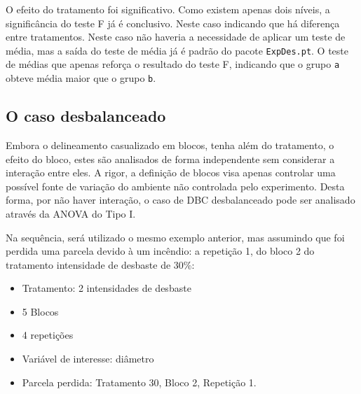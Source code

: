 \documentclass[
]{article}
\providecommand{\tightlist}{%
  \setlength{\itemsep}{0pt}\setlength{\parskip}{0pt}}
\begin{document}
O efeito do tratamento foi significativo. Como existem apenas dois níveis, a significância do teste F já é conclusivo. Neste caso indicando que há diferença entre tratamentos. Neste caso não haveria a necessidade de aplicar um teste de média, mas a saída do teste de média já é padrão do pacote \texttt{ExpDes.pt}. O teste de médias que apenas reforça o resultado do teste F, indicando que o grupo \texttt{a} obteve média maior que o grupo \texttt{b}.

\hypertarget{o-caso-desbalanceado-1}{%
\subsection{O caso desbalanceado}\label{o-caso-desbalanceado-1}}

Embora o delineamento casualizado em blocos, tenha além do tratamento, o efeito do bloco, estes são analisados de forma independente sem considerar a interação entre eles. A rigor, a definição de blocos visa apenas controlar uma possível fonte de variação do ambiente não controlada pelo experimento. Desta forma, por não haver interação, o caso de DBC desbalanceado pode ser analisado através da ANOVA do Tipo I.

Na sequência, será utilizado o mesmo exemplo anterior, mas assumindo que foi perdida uma parcela devido à um incêndio: a repetição 1, do bloco 2 do tratamento intensidade de desbaste de 30\%:

\begin{itemize}
\tightlist
\item
  Tratamento: 2 intensidades de desbaste
\item
  5 Blocos
\item
  4 repetições
\item
  Variável de interesse: diâmetro
\item
  Parcela perdida: Tratamento 30, Bloco 2, Repetição 1.
\end{itemize}
\end{document}
